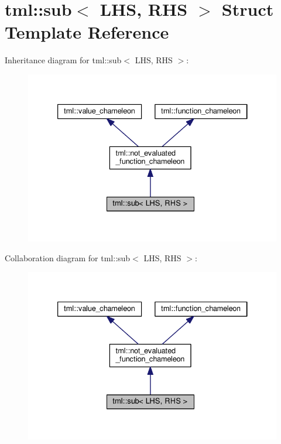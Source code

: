 \hypertarget{structtml_1_1sub}{\section{tml\+:\+:sub$<$ L\+H\+S, R\+H\+S $>$ Struct Template Reference}
\label{structtml_1_1sub}
}


Inheritance diagram for tml\+:\+:sub$<$ L\+H\+S, R\+H\+S $>$\+:
\nopagebreak
\begin{figure}[H]
\begin{center}
\leavevmode
\includegraphics[width=333pt]{structtml_1_1sub__inherit__graph}
\end{center}
\end{figure}


Collaboration diagram for tml\+:\+:sub$<$ L\+H\+S, R\+H\+S $>$\+:
\nopagebreak
\begin{figure}[H]
\begin{center}
\leavevmode
\includegraphics[width=333pt]{structtml_1_1sub__coll__graph}
\end{center}
\end{figure}
